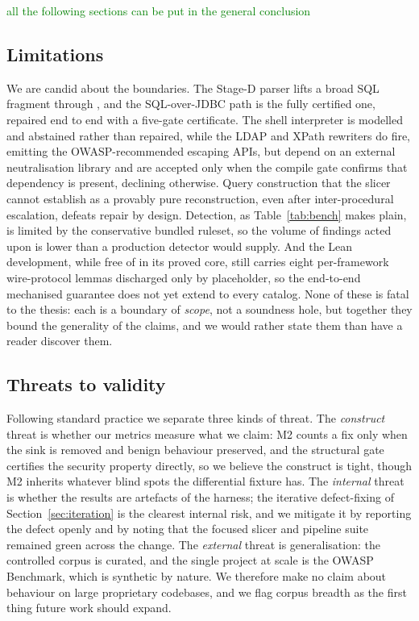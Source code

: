 \textcolor{green}{all the following sections can be put in the general conclusion}

\subsection{Limitations}
\label{sec:disc-limits}

We are candid about the boundaries. The Stage-D parser lifts a broad SQL
fragment through , and the SQL-over-JDBC path is the fully
certified one, repaired end to end with a five-gate certificate. The shell
interpreter is modelled and abstained rather than repaired, while the LDAP
and XPath rewriters do fire, emitting the OWASP-recommended escaping APIs,
but depend on an external neutralisation library and are accepted only when
the compile gate confirms that dependency is present, declining otherwise.
Query construction that the slicer cannot establish as a provably pure
reconstruction, even after inter-procedural escalation, defeats repair by
design.
Detection, as Table~\ref{tab:bench} makes plain, is limited by the
conservative bundled ruleset, so the volume of findings acted upon is lower
than a production detector would supply. And the Lean development, while free
of  in its proved core, still carries eight per-framework
wire-protocol lemmas discharged only by placeholder, so the end-to-end
mechanised guarantee does not yet extend to every catalog. None of these is
fatal to the thesis: each is a boundary of \emph{scope}, not a soundness
hole, but together they bound the generality of the claims, and we would
rather state them than have a reader discover them.

\subsection{Threats to validity}
\label{sec:disc-threats}

Following standard practice we separate three kinds of threat. The
\emph{construct} threat is whether our metrics measure what we claim: M2
counts a fix only when the sink is removed and benign behaviour preserved,
and the structural gate certifies the security property directly, so we
believe the construct is tight, though M2 inherits whatever blind spots the
differential fixture has. The \emph{internal} threat is whether the results
are artefacts of the harness; the iterative defect-fixing of
Section~\ref{sec:iteration} is the clearest internal risk, and we mitigate it
by reporting the defect openly and by noting that the focused slicer and
pipeline suite remained green across the change. The \emph{external} threat is
generalisation: the controlled corpus is curated, and the single project at
scale is the OWASP Benchmark, which is synthetic by nature.
We therefore make no claim about behaviour on large proprietary codebases,
and we flag corpus breadth as the first thing future work should expand.

